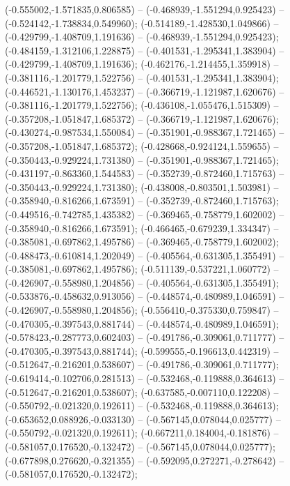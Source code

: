  (-0.555002,-1.571835,0.806585) -- (-0.468939,-1.551294,0.925423) -- (-0.524142,-1.738834,0.549960);
 (-0.514189,-1.428530,1.049866) -- (-0.429799,-1.408709,1.191636) -- (-0.468939,-1.551294,0.925423);
 (-0.484159,-1.312106,1.228875) -- (-0.401531,-1.295341,1.383904) -- (-0.429799,-1.408709,1.191636);
 (-0.462176,-1.214455,1.359918) -- (-0.381116,-1.201779,1.522756) -- (-0.401531,-1.295341,1.383904);
 (-0.446521,-1.130176,1.453237) -- (-0.366719,-1.121987,1.620676) -- (-0.381116,-1.201779,1.522756);
 (-0.436108,-1.055476,1.515309) -- (-0.357208,-1.051847,1.685372) -- (-0.366719,-1.121987,1.620676);
 (-0.430274,-0.987534,1.550084) -- (-0.351901,-0.988367,1.721465) -- (-0.357208,-1.051847,1.685372);
 (-0.428668,-0.924124,1.559655) -- (-0.350443,-0.929224,1.731380) -- (-0.351901,-0.988367,1.721465);
 (-0.431197,-0.863360,1.544583) -- (-0.352739,-0.872460,1.715763) -- (-0.350443,-0.929224,1.731380);
 (-0.438008,-0.803501,1.503981) -- (-0.358940,-0.816266,1.673591) -- (-0.352739,-0.872460,1.715763);
 (-0.449516,-0.742785,1.435382) -- (-0.369465,-0.758779,1.602002) -- (-0.358940,-0.816266,1.673591);
 (-0.466465,-0.679239,1.334347) -- (-0.385081,-0.697862,1.495786) -- (-0.369465,-0.758779,1.602002);
 (-0.488473,-0.610814,1.202049) -- (-0.405564,-0.631305,1.355491) -- (-0.385081,-0.697862,1.495786);
 (-0.511139,-0.537221,1.060772) -- (-0.426907,-0.558980,1.204856) -- (-0.405564,-0.631305,1.355491);
 (-0.533876,-0.458632,0.913056) -- (-0.448574,-0.480989,1.046591) -- (-0.426907,-0.558980,1.204856);
 (-0.556410,-0.375330,0.759847) -- (-0.470305,-0.397543,0.881744) -- (-0.448574,-0.480989,1.046591);
 (-0.578423,-0.287773,0.602403) -- (-0.491786,-0.309061,0.711777) -- (-0.470305,-0.397543,0.881744);
 (-0.599555,-0.196613,0.442319) -- (-0.512647,-0.216201,0.538607) -- (-0.491786,-0.309061,0.711777);
 (-0.619414,-0.102706,0.281513) -- (-0.532468,-0.119888,0.364613) -- (-0.512647,-0.216201,0.538607);
 (-0.637585,-0.007110,0.122208) -- (-0.550792,-0.021320,0.192611) -- (-0.532468,-0.119888,0.364613);
 (-0.653652,0.088926,-0.033130) -- (-0.567145,0.078044,0.025777) -- (-0.550792,-0.021320,0.192611);
 (-0.667211,0.184004,-0.181876) -- (-0.581057,0.176520,-0.132472) -- (-0.567145,0.078044,0.025777);
 (-0.677898,0.276620,-0.321355) -- (-0.592095,0.272271,-0.278642) -- (-0.581057,0.176520,-0.132472);
